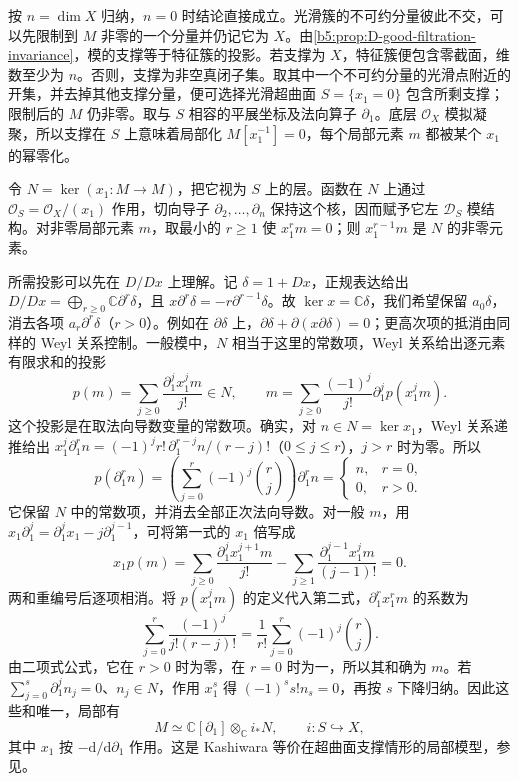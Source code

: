 \begin{proofsketch}
	按 \(n=\dim X\) 归纳，\(n=0\) 时结论直接成立。光滑簇的不可约分量彼此不交，可以先限制到 \(M\) 非零的一个分量并仍记它为 \(X\)。由\cref{b5:prop:D-good-filtration-invariance}，模的支撑等于特征簇的投影。若支撑为 \(X\)，特征簇便包含零截面，维数至少为 \(n\)。否则，支撑为非空真闭子集。取其中一个不可约分量的光滑点附近的开集，并去掉其他支撑分量，便可选择光滑超曲面 \(S=\{x_1=0\}\) 包含所剩支撑；限制后的 \(M\) 仍非零。取与 \(S\) 相容的平展坐标及法向算子 \(\partial_1\)。底层 \(\mathcal O_X\) 模拟凝聚，所以支撑在 \(S\) 上意味着局部化 \(M[x_1^{-1}]=0\)，每个局部元素 \(m\) 都被某个 \(x_1\) 的幂零化。

	令 \(N=\ker(x_1:M\to M)\)，把它视为 \(S\) 上的层。函数在 \(N\) 上通过 \(\mathcal O_S=\mathcal O_X/(x_1)\) 作用，切向导子 \(\partial_2,\ldots,\partial_n\) 保持这个核，因而赋予它左 \(\mathcal D_S\) 模结构。对非零局部元素 \(m\)，取最小的 \(r\ge1\) 使 \(x_1^rm=0\)；则 \(x_1^{r-1}m\) 是 \(N\) 的非零元素。

	所需投影可以先在 \(D/Dx\) 上理解。记 \(\delta=1+Dx\)，正规表达给出 \(D/Dx=\bigoplus_{r\ge0}\mathbb C\partial^r\delta\)，且 \(x\partial^r\delta=-r\partial^{r-1}\delta\)。故 \(\ker x=\mathbb C\delta\)，我们希望保留 \(a_0\delta\)，消去各项 \(a_r\partial^r\delta\)（\(r>0\)）。例如在 \(\partial\delta\) 上，\(\partial\delta+\partial(x\partial\delta)=0\)；更高次项的抵消由同样的 Weyl 关系控制。一般模中，\(N\) 相当于这里的常数项，Weyl 关系给出逐元素有限求和的投影
	\[
		p(m)=\sum_{j\ge0}\frac{\partial_1^j x_1^jm}{j!}\in N, \qquad m=\sum_{j\ge0}\frac{(-1)^j}{j!}\partial_1^j p(x_1^jm).
	\]
	这个投影是在取法向导数变量的常数项。确实，对 \(n\in N=\ker x_1\)，Weyl 关系递推给出 \(x_1^j\partial_1^r n=(-1)^j r!\,\partial_1^{r-j}n/(r-j)!\)（\(0\le j\le r\)），\(j>r\) 时为零。所以
	\[
		p(\partial_1^r n) =\left(\sum_{j=0}^r(-1)^j\binom rj\right)\partial_1^r n
		=\begin{cases}n,&r=0,\\0,&r>0.\end{cases}
	\]
	它保留 \(N\) 中的常数项，并消去全部正次法向导数。对一般 \(m\)，用 \(x_1\partial_1^j=\partial_1^jx_1-j\partial_1^{j-1}\)，可将第一式的 \(x_1\) 倍写成
	\[
		x_1p(m)=\sum_{j\ge0}\frac{\partial_1^jx_1^{j+1}m}{j!} -\sum_{j\ge1}\frac{\partial_1^{j-1}x_1^jm}{(j-1)!}=0.
	\]
	两和重编号后逐项相消。将 \(p(x_1^jm)\) 的定义代入第二式，\(\partial_1^rx_1^rm\) 的系数为
	\[
		\sum_{j=0}^r\frac{(-1)^j}{j!(r-j)!} =\frac{1}{r!}\sum_{j=0}^r(-1)^j\binom rj.
	\]
	由二项式公式，它在 \(r>0\) 时为零，在 \(r=0\) 时为一，所以其和确为 \(m\)。若 \(\sum_{j=0}^s\partial_1^jn_j=0\)、\(n_j\in N\)，作用 \(x_1^s\) 得 \((-1)^ss!n_s=0\)，再按 \(s\) 下降归纳。因此这些和唯一，局部有
	\[
		M\simeq\mathbb C[\partial_1]\otimes_{\mathbb C}i_*N, \qquad i:S\hookrightarrow X,
	\]
	其中 \(x_1\) 按 \(-\mathrm{d}/\mathrm{d}\partial_1\) 作用。这是 Kashiwara 等价在超曲面支撑情形的局部模型，参见\cite[Theorem 1.6.1 and its proof, pp. 48--50]{HottaTakeuchiTanisaki2008DModules}。


\end{proofsketch}

